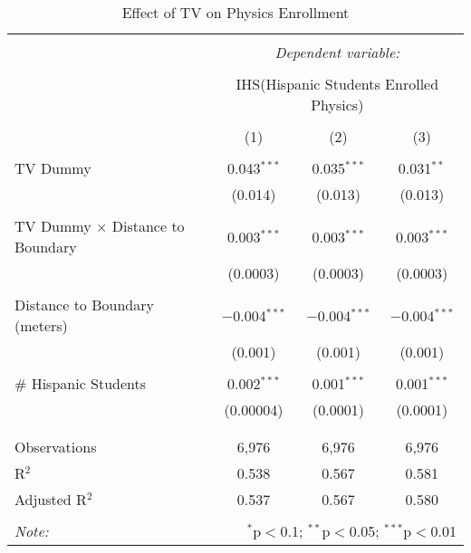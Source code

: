 
\begin{table}[!htbp] \centering 
  \caption{Effect of TV on Physics Enrollment} 
  \label{} 
\begin{tabular}{@{\extracolsep{-2pt}}lccc} 
\\[-1.8ex]\hline 
\hline \\[-1.8ex] 
 & \multicolumn{3}{c}{\textit{Dependent variable:}} \\ 
\cline{2-4} 
\\[-1.8ex] & \multicolumn{3}{c}{IHS(Hispanic Students Enrolled Physics)} \\ 
\\[-1.8ex] & (1) & (2) & (3)\\ 
\hline \\[-1.8ex] 
 TV Dummy & 0.043$^{***}$ & 0.035$^{***}$ & 0.031$^{**}$ \\ 
  & (0.014) & (0.013) & (0.013) \\ 
  & & & \\ 
 TV Dummy $\times$ Distance to Boundary & 0.003$^{***}$ & 0.003$^{***}$ & 0.003$^{***}$ \\ 
  & (0.0003) & (0.0003) & (0.0003) \\ 
  & & & \\ 
 Distance to Boundary (meters) & $-$0.004$^{***}$ & $-$0.004$^{***}$ & $-$0.004$^{***}$ \\ 
  & (0.001) & (0.001) & (0.001) \\ 
  & & & \\ 
 \# Hispanic Students & 0.002$^{***}$ & 0.001$^{***}$ & 0.001$^{***}$ \\ 
  & (0.00004) & (0.0001) & (0.0001) \\ 
  & & & \\ 
\hline \\[-1.8ex] 
Observations & 6,976 & 6,976 & 6,976 \\ 
R$^{2}$ & 0.538 & 0.567 & 0.581 \\ 
Adjusted R$^{2}$ & 0.537 & 0.567 & 0.580 \\ 
\hline 
\hline \\[-1.8ex] 
\textit{Note:}  & \multicolumn{3}{r}{$^{*}$p$<$0.1; $^{**}$p$<$0.05; $^{***}$p$<$0.01} \\ 
\end{tabular} 
\end{table} 

